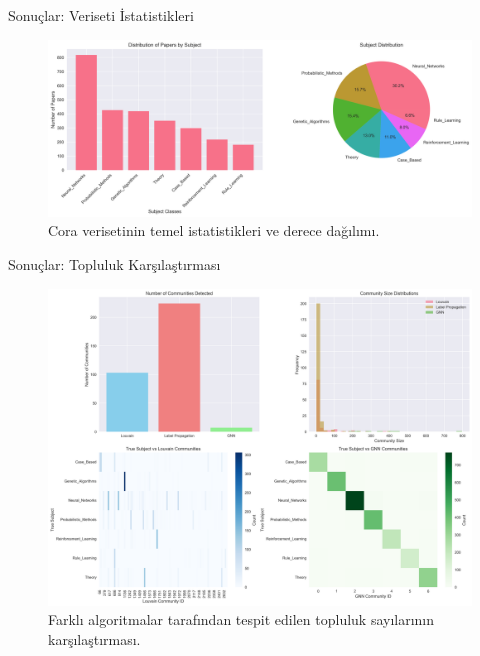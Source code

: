 \documentclass{beamer}
\begin{document}
\begin{frame}{Sonuçlar: Veriseti İstatistikleri}
    \begin{figure}
        \includegraphics[width=\textwidth]{../results/dataset_stats.png}
        \caption{Cora verisetinin temel istatistikleri ve derece dağılımı.}
    \end{figure}
\end{frame}

\begin{frame}{Sonuçlar: Topluluk Karşılaştırması}
    \begin{figure}
        \includegraphics[width=\textwidth]{../results/community_comparison.png}
        \caption{Farklı algoritmalar tarafından tespit edilen topluluk sayılarının karşılaştırması.}
    \end{figure}
\end{frame}
\end{document}
